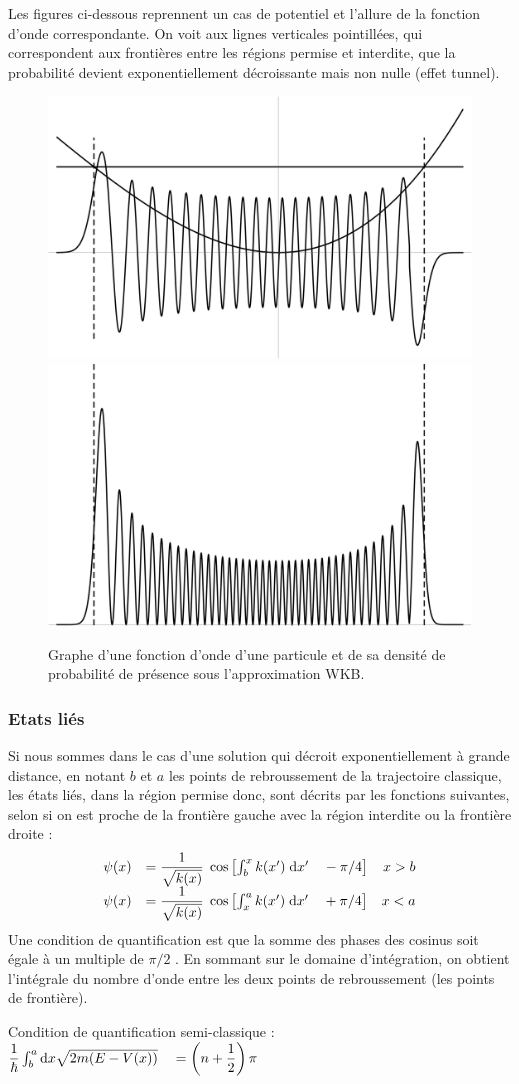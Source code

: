 Les figures ci-dessous reprennent un cas de potentiel et l'allure de la fonction d'onde correspondante. On voit aux lignes verticales pointillées, qui correspondent aux frontières entre les régions permise et interdite, que la probabilité devient exponentiellement décroissante mais non nulle (effet tunnel).
\begin{figure}[h]
  \centering
  \includegraphics[width=.4\linewidth]{images/WKB_approximation_example.svg.png} \\ \includegraphics[width=.4\linewidth]{images/WKB_approximation_example_2.svg.png}
  \caption{Graphe d'une fonction d'onde d'une particule et de sa densité de probabilité de présence sous l'approximation WKB.}
\end{figure}

\subsubsection{Etats liés}
Si nous sommes dans le cas d'une solution qui décroit exponentiellement à grande distance, en notant $b$ et $a$ les points de rebroussement de la trajectoire classique, les états liés, dans la région permise donc, sont décrits par les fonctions suivantes, selon si on est proche de la frontière gauche avec la région interdite ou la frontière droite :
\begin{equation}
  \begin{array}{llr}
    \psi(x) &= \dfrac{1}{\sqrt{k(x)}} \; \cos\left[\int_b ^x k(x')\; \mathrm{d} x' \quad - \pi/4\right] & x>b \\   
    \psi(x) &= \dfrac{1}{\sqrt{k(x)}} \; \cos\left[\int_x ^a k(x')\; \mathrm{d} x' \quad + \pi/4\right] & x<a    
  \end{array}
\end{equation}
Une condition de quantification est que la somme des phases des cosinus soit égale à un multiple de $\pi/2$ . En sommant sur le domaine d'intégration, on obtient l'intégrale du nombre d'onde entre les deux points de rebroussement (les points de frontière).
\begin{center}
  Condition de quantification semi-classique : $\dfrac{1}{\hbar} \int_b ^a \mathrm{d}x \sqrt{2m(E-V(x))} \quad = \left(n+\dfrac{1}{2}\right) \pi$
\end{center}

